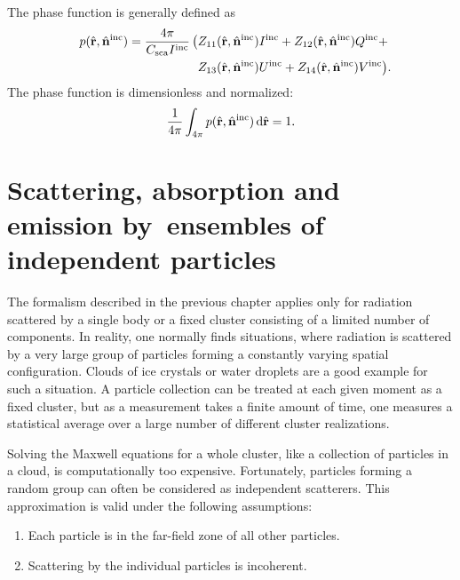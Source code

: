 The phase function is generally defined as
\begin{eqnarray}\label{eq:rtetheory:phase_function}
  p(\hat{\VctStl{r}}, \hat{\VctStl{n}}^{\inc}) =
    \frac{4\pi}{C_{\sca} I^{\inc}} \, \bigl( &
         Z_{11}(\hat{\VctStl{r}}, \hat{\VctStl{n}}^{\inc})I^{\inc}
       + Z_{12}(\hat{\VctStl{r}}, \hat{\VctStl{n}}^{\inc})Q^{\inc} \rlap{${}+$} \\
    &    Z_{13}(\hat{\VctStl{r}}, \hat{\VctStl{n}}^{\inc})U^{\inc}
       + Z_{14}(\hat{\VctStl{r}}, \hat{\VctStl{n}}^{\inc})V^{\inc} \rlap{$\bigr)$.}
 \end{eqnarray}
The phase function is dimensionless and normalized:
\begin{equation}
  \frac{1}{4\pi}\int_{4\pi} 
  p(\hat{\mathbf{r}}, \hat{\mathbf{n}}^{\mathrm{inc}}) \,\mathrm{d}\hat{\mathbf{r}} = 1.
\end{equation}



\section[Particle Ensembles]{Scattering, absorption and emission by~ensembles of independent particles}
\label{sec:rtetheory:part_ensembles}

The formalism described in the previous chapter applies only for
radiation scattered by a single body or a fixed cluster consisting of
a limited number of components. In reality, one normally finds
situations, where radiation is scattered by a very large group of
particles forming a constantly varying spatial configuration. Clouds
of ice crystals or water droplets are a good example for such a
situation. A particle collection can be treated at each given moment
as a fixed cluster, but as a measurement takes a finite amount of
time, one measures a statistical average over a large number of
different cluster realizations.

Solving the Maxwell equations for a whole cluster, like a collection
of particles in a cloud, is computationally too expensive.
Fortunately, particles forming a random group can often be considered
as independent scatterers. This approximation is valid under the
following assumptions:
\begin{enumerate}
\item Each particle is in the far-field zone of all other particles.
\item Scattering by the individual particles is incoherent.
\end{enumerate}

